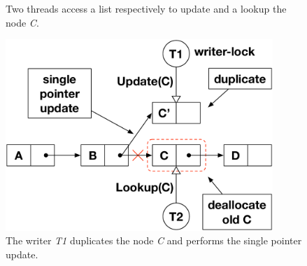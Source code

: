 \begin{refsection}
\begin{figure}[b]
  \vspace{-10pt}
  \begin{minipage}[b]{0.47\textwidth}
    \begin{flushleft}
      \centering
      \caption{Two threads access a list respectively to update and a lookup the
        node \emph{C}.}
      \label{fig:rcu_ex1}
    \end{flushleft}
  \end{minipage}
  \hfill
  \begin{minipage}[b]{0.47\textwidth}
    \begin{flushright}
      \centering
      \includegraphics[width=0.9\textwidth]{figures/rcu_ex2}
      \caption{The writer \emph{T1} duplicates the node \emph{C} and performs the
        single pointer update.}
      \label{fig:rcu_ex2}
    \end{flushright}
  \end{minipage}
  \vspace{-10pt}
\end{figure}


\end{refsection}
